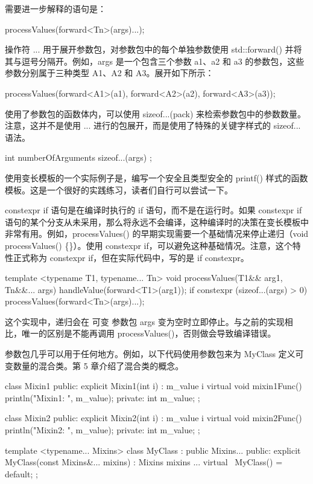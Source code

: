 需要进一步解释的语句是：

\begin{cpp}
processValues(forward<Tn>(args)...);
\end{cpp}

操作符 ... 用于展开参数包，对参数包中的每个单独参数使用 std::forward() 并将其与逗号分隔开。例如，args 是一个包含三个参数 a1、a2 和 a3 的参数包，这些参数分别属于三种类型 A1、A2 和 A3。展开如下所示：

\begin{cpp}
processValues(forward<A1>(a1),
              forward<A2>(a2),
              forward<A3>(a3));
\end{cpp}

使用了参数包的函数体内，可以使用 sizeof...(pack) 来检索参数包中的参数数量。注意，这并不是使用 ... 进行的包展开，而是使用了特殊的关键字样式的 sizeof... 语法。

\begin{cpp}
int numberOfArguments { sizeof...(args) };
\end{cpp}

使用变长模板的一个实际例子是，编写一个安全且类型安全的 printf() 样式的函数模板。这是一个很好的实践练习，读者们自行可以尝试一下。


constexpr if 语句是在编译时执行的 if 语句，而不是在运行时。如果 constexpr if 语句的某个分支从未采用，那么将永远不会编译，这种编译时的决策在变长模板中非常有用。例如，processValues() 的早期实现需要一个基础情况来停止递归（void processValues() \{\}）。使用 constexpr if，可以避免这种基础情况。注意，这个特性正式称为 constexpr if，但在实际代码中，写的是 if constexpr。

\begin{cpp}
template <typename T1, typename... Tn>
void processValues(T1&& arg1, Tn&&... args)
{
    handleValue(forward<T1>(arg1));
    if constexpr (sizeof...(args) > 0) {
        processValues(forward<Tn>(args)...);
    }
}
\end{cpp}

这个实现中，递归会在 可变 参数包 args 变为空时立即停止。与之前的实现相比，唯一的区别是不能再调用 processValues()，否则做会导致编译错误。


参数包几乎可以用于任何地方。例如，以下代码使用参数包来为 MyClass 定义可变数量的混合类。第 5 章介绍了混合类的概念。

\begin{cpp}
class Mixin1
{
    public:
        explicit Mixin1(int i) : m_value { i } {}
        virtual void mixin1Func() { println("Mixin1: {}", m_value); }
    private:
        int m_value;
};

class Mixin2
{
    public:
        explicit Mixin2(int i) : m_value { i } {}
        virtual void mixin2Func() { println("Mixin2: {}", m_value); }
    private:
        int m_value;
};

template <typename... Mixins>
class MyClass : public Mixins...
{
    public:
        explicit MyClass(const Mixins&... mixins) : Mixins { mixins }... {}
        virtual ~MyClass() = default;
};
\end{cpp}

